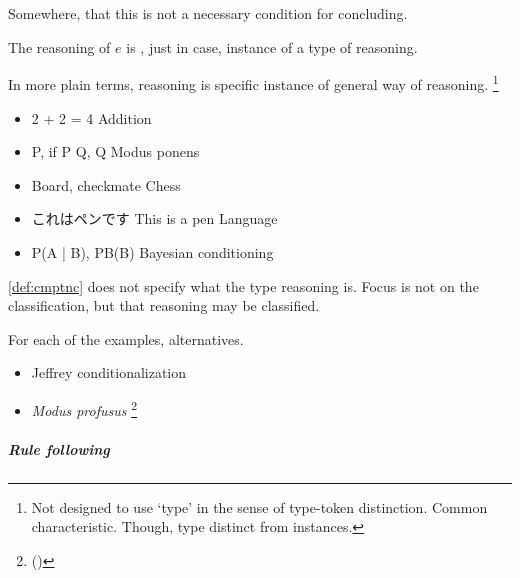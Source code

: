 \chapter{}
\label{cha:typical}

\section{}
\label{sec:gr-sr}

{
  \color{red}
  Somewhere, that this is not a necessary condition for concluding.
}

\begin{note}

  \begin{definition}[\sR{2}]
    \label{def:cmptnc}
    The reasoning of \(e\) is \emph{}, just in case, instance of a type of reasoning.
  \end{definition}

  In more plain terms, reasoning is specific instance of general way of reasoning.%
  \footnote{
    Not designed to use `type' in the sense of type-token distinction.
    Common characteristic.
    Though, type distinct from instances.
  }

  \begin{itemize}
  \item
    2 + 2 = 4 Addition
  \item
    P, if P Q, Q Modus ponens
  \item
    Board, checkmate Chess
  \item
    これはペンです This is a pen Language
  \item
    P(A | B), PB(B) Bayesian conditioning
  \end{itemize}

  \autoref{def:cmptnc} does not specify what the type reasoning is.
  Focus is not on the classification, but that reasoning may be classified.

  For each of the examples, alternatives.
  \begin{itemize}
  \item
    Jeffrey conditionalization
  \item
    \emph{Modus profusus}%
    \footnote{
       (\cite[317]{Turri:2010aa})
    }
  \end{itemize}
\end{note}



\paragraph{Rule following}

